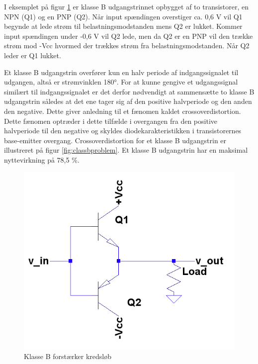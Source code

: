 I eksemplet på figur \ref{fig:classb} er klasse B udgangstrinnet opbygget af to transistorer, en NPN (Q1) og en PNP (Q2). Når input spændingen overstiger ca. 0,6 V vil Q1 begynde at lede strøm til belastningsmodstanden mens Q2 er lukket. Kommer input spændingen under -0,6 V vil Q2 lede, men da Q2 er en PNP vil den trække strøm mod -Vcc hvormed der trækkes strøm fra belastningsmodstanden. Når Q2 leder er Q1 lukket. 

Et klasse B udgangstrin overfører kun en halv periode af indgangssignalet til udgangen, altså er strømvinklen 180°. For at kunne gengive et udgangssignal similært til indgangssignalet er det derfor nødvendigt at sammensætte to klasse B udgangstrin således at det ene tager sig af den positive halvperiode og den anden den negative. Dette giver anledning til et fænomen kaldet crossoverdistortion. Dette fænomen optræder i dette tilfælde i overgangen fra den positive halvperiode til den negative og skyldes diodekarakteristikken i transistorernes base-emitter overgang. Crossoverdistortion for et klasse B udgangstrin er illustreret på figur \ref{fig:classbproblem}.
Et klasse B udgangstrin har en maksimal nyttevirkning på 78,5 \%. \cite{sedra-smith}%

\begin{figure}[h]
\centering
\includegraphics[scale=.35]{valg_af_loesning/klasser/classb.png}
\caption{Klasse B forstærker kredsløb\cite{sedra-smith}}
\label{fig:classb}
\end{figure}

